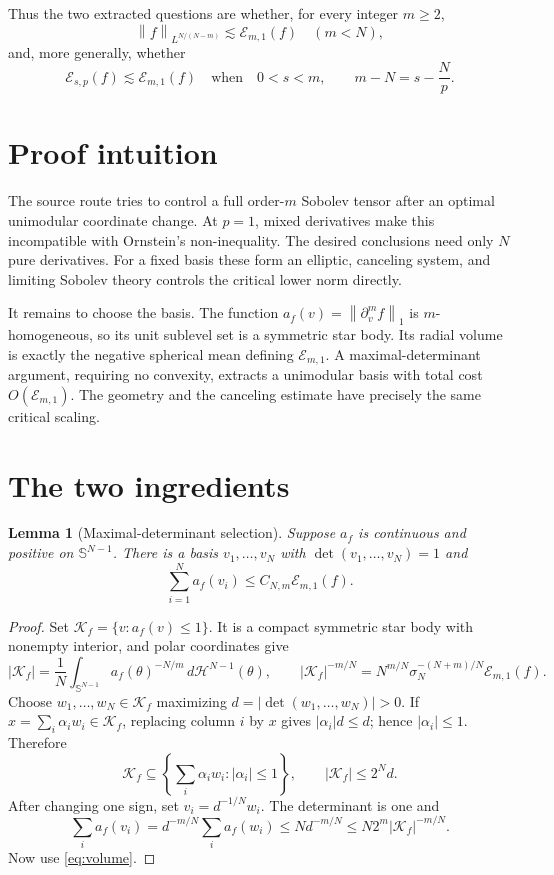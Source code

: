 \documentclass[11pt]{article}
\newtheorem{lemma}{Lemma}
\newcommand{\Sph}{\mathbb S}
\newcommand{\E}{\mathscr E}
\newcommand{\cK}{\mathcal K}
\newcommand{\norm}[1]{\left\lVert #1\right\rVert}
\newcommand{\abs}[1]{\left\lvert #1\right\rvert}
\begin{document}
Thus the two extracted questions are whether, for every integer \(m\geq2\),
\[
 \norm{f}_{L^{N/(N-m)}}\lesssim\E_{m,1}(f)\quad(m<N),
\]
and, more generally, whether
\[
 \E_{s,p}(f)\lesssim\E_{m,1}(f)
 \quad\text{when}\quad 0<s<m,\qquad m-N=s-\frac Np.
\]

\section{Proof intuition}

The source route tries to control a full order-\(m\) Sobolev tensor after an
optimal unimodular coordinate change.  At \(p=1\), mixed derivatives make this
incompatible with Ornstein's non-inequality.  The desired conclusions need
only \(N\) pure derivatives.  For a fixed basis these form an elliptic,
canceling system, and limiting Sobolev theory controls the critical lower norm
directly.

It remains to choose the basis.  The function
\(a_f(v)=\norm{\partial_v^m f}_1\) is \(m\)-homogeneous, so its unit sublevel
set is a symmetric star body.  Its radial volume is exactly the negative
spherical mean defining \(\E_{m,1}\).  A maximal-determinant argument,
requiring no convexity, extracts a unimodular basis with total cost
\(O(\E_{m,1})\).  The geometry and the canceling estimate have precisely the
same critical scaling.

\section{The two ingredients}

\begin{lemma}[Maximal-determinant selection]\label{lem:selection}
Suppose \(a_f\) is continuous and positive on \(\Sph^{N-1}\).  There is a
basis \(v_1,\ldots,v_N\) with \(\det(v_1,\ldots,v_N)=1\) and
\[
 \sum_{i=1}^N a_f(v_i)\leq C_{N,m}\E_{m,1}(f).
\]
\end{lemma}

\begin{proof}
Set \(\cK_f=\{v:a_f(v)\leq1\}\).  It is a compact symmetric star body with
nonempty interior, and polar coordinates give
\begin{equation}\label{eq:volume}
 \abs{\cK_f}
 =\frac1N\int_{\Sph^{N-1}}a_f(\theta)^{-N/m}\,d\mathcal H^{N-1}(\theta),
\qquad
 \abs{\cK_f}^{-m/N}
 =N^{m/N}\sigma_N^{-(N+m)/N}\E_{m,1}(f).
\end{equation}
Choose \(w_1,\ldots,w_N\in\cK_f\) maximizing
\(d=\abs{\det(w_1,\ldots,w_N)}>0\).  If
\(x=\sum_i\alpha_iw_i\in\cK_f\), replacing column \(i\) by \(x\) gives
\(\abs{\alpha_i}d\leq d\); hence \(\abs{\alpha_i}\leq1\).  Therefore
\[
 \cK_f\subseteq
 \left\{\sum_i\alpha_iw_i:\abs{\alpha_i}\leq1\right\},
\qquad \abs{\cK_f}\leq2^N d.
\]
After changing one sign, set \(v_i=d^{-1/N}w_i\).  The determinant is one and
\[
 \sum_i a_f(v_i)
 =d^{-m/N}\sum_i a_f(w_i)
 \leq N d^{-m/N}
 \leq N2^m\abs{\cK_f}^{-m/N}.
\]
Now use \eqref{eq:volume}.
\end{proof}
\end{document}
